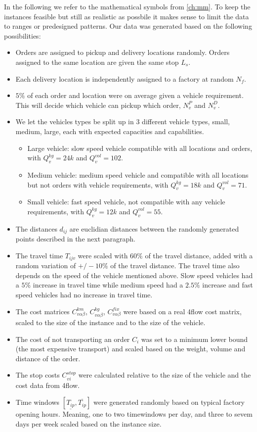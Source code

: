 \documentclass[../main.tex]{subfiles}
\begin{document}
\par
In the following we refer to the mathematical symbols from \ref{ch:mm}. To keep the instances feasible but still as realistic as possbile it makes sense to limit the data to ranges or predesigned patterns.
Our data was generated based on the following possibilities:
\begin{itemize}
    \item Orders are assigned to pickup and delivery locations randomly. Orders assigned to the same location are given the same stop $L_s$.
    \item Each delivery location is independently assigned to a factory at random $N_f$.
    \item $5\%$ of each order and location were on average given a vehicle requirement. This will decide which vehicle can pickup which order, $N^P_v$ and $N^D_v$.
    \item We let the vehicles types be split up in 3 different vehicle types, small, medium, large, each with expected capacities and capabilities.
        \begin{itemize}
            \item Large vehicle: slow speed vehicle compatible with all locations and orders, with $Q^{kg}_v=24k$ and $Q^{vol}_v=102$.
            \item Medium vehicle: medium speed vehicle and compatible with all locations but not orders with vehicle requirements, with $Q^{kg}_v=18k$ and $Q^{vol}_v=71$.
            \item Small vehicle: fast speed vehicle, not compatible with any vehicle requirements, with $Q^{kg}_v=12k$ and $Q^{vol}_v=55$.
        \end{itemize}
    \item The distances $d_{ij}$ are euclidian distances between the randomly generated points described in the next paragraph.
    \item The travel time $T_{ijv}$ were scaled with $60\%$ of the travel distance, added with a random variation of $+/- 10\%$ of the travel distance. The travel time also depends on the speed of the vehicle mentioned above. Slow speed vehicles had a $5\%$ increase in travel time while medium speed had a $2.5\%$ increase and fast speed vehicles had no increase in travel time.
    \item The cost matrices $C^{km}_{v\alpha\beta}$, $C^{kg}_{v\alpha\beta}$, $C^{fix}_{v\alpha\beta}$ were based on a real 4flow cost matrix, scaled to the size of the instance and to the size of the vehicle.  
    \item The cost of not transporting an order $C_i$ was set to a minimum lower bound (the most expensive transport) and scaled based on the weight, volume and distance of the order.
    \item The stop costs $C^{stop}_{vi}$ were calculated relative to the size of the vehicle and the cost data from 4flow.
    \item Time windows $[\underline{T_{ip}},\overline{T_{ip}}]$  were generated randomly based on typical factory opening hours. Meaning, one to two timewindows per day, and three to sevem days per week scaled based on the instance size. 
\end{itemize}
\end{document}
